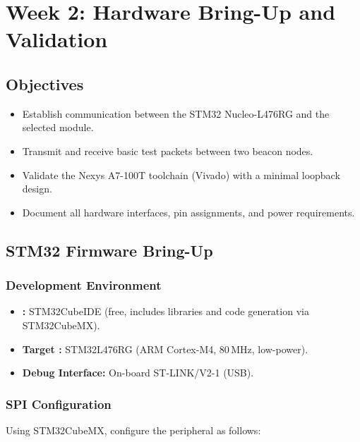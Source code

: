 \documentclass[11pt,letterpaper]{article}
\begin{document}
	\newpage
	\section{Week 2: Hardware Bring-Up and Validation}
	\label{sec:bringup}
	
	\subsection{Objectives}
	
	\begin{itemize}[leftmargin=2em]
		\item Establish \SPI{} communication between the STM32 Nucleo-L476RG and the selected \RF{} module.
		\item Transmit and receive basic test packets between two beacon nodes.
		\item Validate the Nexys A7-100T \FPGA{} toolchain (Vivado) with a minimal loopback design.
		\item Document all hardware interfaces, pin assignments, and power requirements.
	\end{itemize}
	
	\subsection{STM32 Firmware Bring-Up}
	
	\subsubsection{Development Environment}
	
	\begin{itemize}[leftmargin=2em]
		\item \textbf{\IDE{}:} STM32CubeIDE (free, includes \HAL{} libraries and code generation via STM32CubeMX).
		\item \textbf{Target \MCU{}:} STM32L476RG (ARM Cortex-M4, 80\,MHz, low-power).
		\item \textbf{Debug Interface:} On-board ST-LINK/V2-1 (USB).
	\end{itemize}
	
	\subsubsection{SPI Configuration}
	
	Using STM32CubeMX, configure the \SPI{} peripheral as follows:
	
\end{document}
